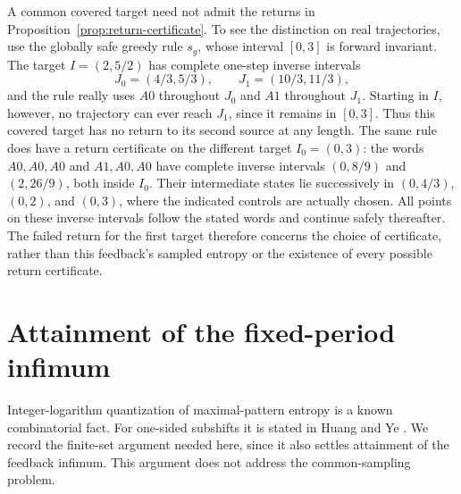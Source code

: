 \documentclass[11pt,reqno]{amsart}
\numberwithin{equation}{section}
\theoremstyle{definition}
\begin{document}
A common covered target need not admit the returns in
Proposition~\ref{prop:return-certificate}. To see the distinction
on real trajectories, use the globally safe greedy rule $s_g$,
whose interval $[0,3]$ is forward invariant. The target
$I=(2,5/2)$ has complete one-step inverse intervals
\[
 J_0=(4/3,5/3),\qquad J_1=(10/3,11/3),
\]
and the rule really uses $A0$ throughout $J_0$ and $A1$
throughout $J_1$. Starting in $I$, however, no trajectory can
ever reach $J_1$, since it remains in $[0,3]$. Thus this
covered target has no return to its second source at any length.
The same rule does have a return certificate on the different
target $I_0=(0,3)$: the words $A0,A0,A0$ and $A1,A0,A0$
have complete inverse intervals $(0,8/9)$ and $(2,26/9)$,
both inside $I_0$. Their intermediate states lie successively
in $(0,4/3)$, $(0,2)$, and $(0,3)$, where the indicated
controls are actually chosen. All points on these inverse
intervals follow the stated words and continue safely thereafter.
The failed return for the first target therefore concerns the
choice of certificate, rather than this feedback's sampled entropy
or the existence of every possible return certificate.


\section{Attainment of the fixed-period infimum}\label{app:minimum}

Integer-logarithm quantization of maximal-pattern entropy is a known
combinatorial fact. For one-sided subshifts it is stated in
Huang and Ye \cite[Theorem~5.5]{HuangYe2009}. We record the finite-set
argument needed here, since it also settles attainment of the feedback
infimum. This argument does not address the common-sampling problem.
\end{document}
